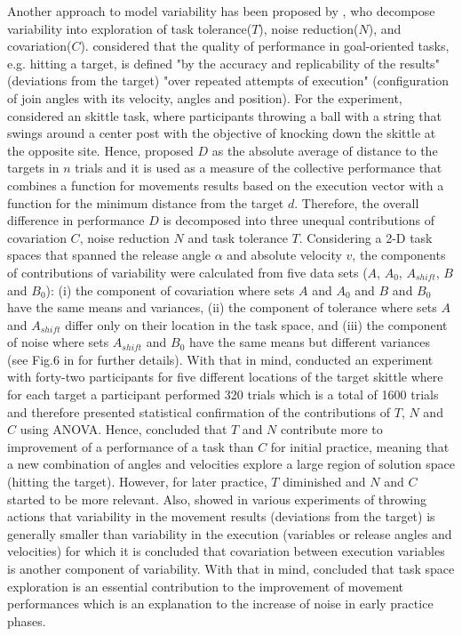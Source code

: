 Another approach to model variability has been proposed by \cite{muller2004},
who decompose variability into exploration of 
task tolerance($T$), noise reduction($N$), and covariation($C$).
\citealt[p. 229]{muller2004} considered that the quality of performance in 
goal-oriented tasks, 
e.g. hitting a target, is defined "by the accuracy and replicability of the 
results" (deviations from the target) "over repeated attempts of execution" 
(configuration of join angles with its velocity, angles and position). 
For the experiment, \cite{muller2004} considered an skittle task, 
where participants throwing a ball with a string that swings around 
a center post with the objective of knocking down the skittle at the 
opposite site.
Hence, \cite{muller2004} proposed $D$ as the absolute average of distance to
the targets in $n$ trials and it is used as a measure of the collective 
performance that combines a function for movements results based on the 
execution vector with a function for the minimum distance from the target $d$.
Therefore, the overall difference in performance $D$ is decomposed
into three unequal contributions of covariation $C$, 
noise reduction $N$ and task tolerance $T$.
Considering a 2-D task spaces that spanned the release angle $\alpha$
and absolute velocity $v$, the components of contributions of
variability were calculated from five data sets 
($A$, $A_0$, $A_{shift}$, $B$ and $B_0$):
(i) the component of covariation where sets $A$ and $A_0$ and $B$ and $B_0$ 
have the same means and variances,
(ii) the component of tolerance where sets $A$ and $A_{shift}$ differ only on
their location in the task space, and 
(iii) the component of noise where sets $A_{shift}$ and $B_0$ have the same
means but different variances 
(see Fig.6 in \cite{muller2004} for further details).
With that in mind, \cite{muller2004} conducted an experiment with 
forty-two participants for five different locations of the target 
skittle where for each target a participant performed 320 trials which is a 
total of 1600 trials and therefore presented statistical confirmation of the 
contributions of $T$, $N$ and $C$ using ANOVA. Hence, \cite{muller2004} 
concluded that $T$ and $N$ contribute more to improvement of a 
performance of a task than $C$ for initial practice, 
meaning that a new combination of angles and velocities explore a 
large region of solution space (hitting the target).
However, for later practice, $T$ diminished  and $N$ and $C$ started to 
be more relevant.
Also, \cite{muller2004} showed in various experiments of throwing actions
that variability in the movement results (deviations from the target) 
is generally smaller than variability in the execution
(variables or release angles and velocities) for which 
it is concluded that covariation between execution variables
is another component of variability.
With that in mind, \cite{muller2004} concluded that task space exploration 
is an essential  contribution to the improvement of movement performances
which is an explanation to the increase of noise in early practice phases.


